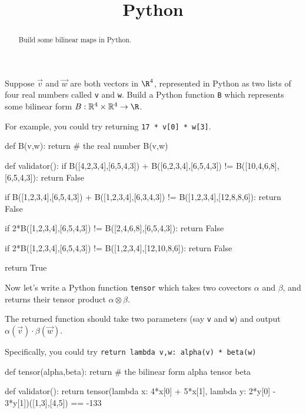 \documentclass{ximera}
\title{Python}
\begin{document}
\begin{abstract}
  Build some bilinear maps in Python.
\end{abstract}\maketitle	

\begin{question}
  Suppose $\vec{v}$ and $\vec{w}$ are both vectors in $\R^4$, represented in Python as two lists of four real numbers called \texttt{v} and \texttt{w}.  Build a Python function \texttt{B} which represents some bilinear form $B : \mathbb{R}^4 \times \mathbb{R}^4 \to \R$.

  \begin{solution}
    \begin{hint}
      For example, you could try returning \texttt{17 * v[0] * w[3]}.
    \end{hint}
    \begin{python}
def B(v,w):
  return # the real number B(v,w)

def validator():
  if B([4,2,3,4],[6,5,4,3]) + B([6,2,3,4],[6,5,4,3]) != B([10,4,6,8],[6,5,4,3]):
    return False

  if B([1,2,3,4],[6,5,4,3]) + B([1,2,3,4],[6,3,4,3]) != B([1,2,3,4],[12,8,8,6]):
    return False

  if 2*B([1,2,3,4],[6,5,4,3]) != B([2,4,6,8],[6,5,4,3]):
    return False

  if 2*B([1,2,3,4],[6,5,4,3]) != B([1,2,3,4],[12,10,8,6]):
    return False

  return True
    \end{python}
  \end{solution}

Now let's write a Python function \texttt{tensor} which takes two covectors $\alpha$ and $\beta$, and returns their tensor product $\alpha \otimes \beta$.  

  \begin{solution}
    \begin{hint}
      The returned function should take two parameters (say \texttt{v} and \texttt{w}) and output $\alpha(\vec{v}) \cdot \beta(\vec{w})$.
    \end{hint}
    \begin{hint}
      Specifically, you could try \texttt{return lambda v,w: alpha(v) * beta(w)}
    \end{hint}
    \begin{python}
def tensor(alpha,beta):
  return # the bilinear form alpha tensor beta

def validator():
  return tensor(lambda x: 4*x[0] + 5*x[1], lambda y: 2*y[0] - 3*y[1])([1,3],[4,5]) == -133
    \end{python}
  \end{solution}

\end{question}
\end{document}
